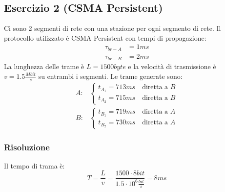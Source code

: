 \documentclass[a4paper]{article}
\begin{document}
\subsection{Esercizio 2 (CSMA Persistent)}
Ci sono 2 segmenti di rete con una stazione per ogni segmento di rete. Il protocollo
utilizzato è CSMA Persistent con tempi di propagazione:
\[
\begin{aligned}
  \tau_{br-A} &= 1ms \\
  \tau_{br-B} &= 2ms
\end{aligned}
\] 
La lunghezza delle trame è \( L = 1500 byte\) e la velocità di trasmissione è
\( v = 1.5 \frac{Mbit}{s} \) su entrambi i segmenti. Le trame generate sono:
\[
\begin{aligned}
  A: & \begin{cases}
    t_{A_1} = 713ms \quad \text{diretta a }B\\
    t_{A_2} = 715ms \quad \text{diretta a }B
  \end{cases}\\
    B: & \begin{cases}
      t_{B_1} = 719ms \quad \text{diretta a }A\\
      t_{B_2} = 730ms \quad \text{diretta a }A
    \end{cases}
\end{aligned}
\] 

\subsubsection{Risoluzione}
Il tempo di trama è:
\[
T = \frac{L}{v} = \frac{1500 \cdot  8bit}{1.5 \cdot  10^6 \frac{bit}{s}} = 8ms
\] 
\end{document}
